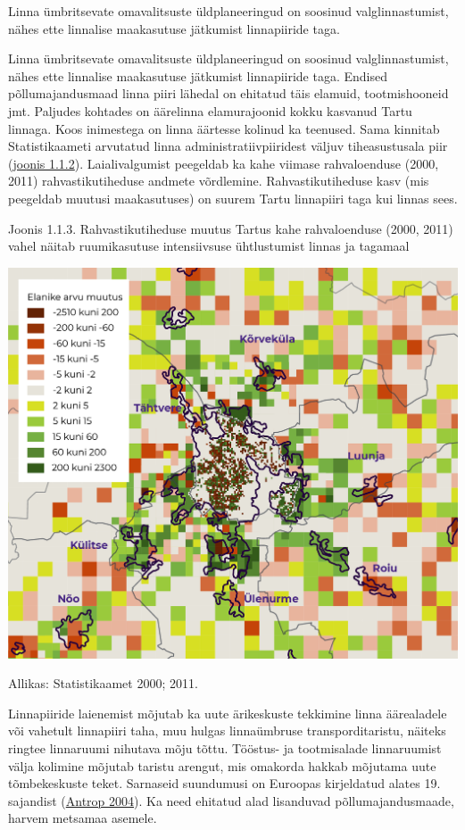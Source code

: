 \documentclass[estonian,]{article}
\begin{document}
\begin{blockquote-left}
Linna ümbritsevate omavalitsuste üldplaneeringud on soosinud
valglinnastumist, nähes ette linnalise maakasutuse jätkumist
linnapiiride taga.
\end{blockquote-left}

Linna ümbritsevate omavalitsuste üldplaneeringud on soosinud valglinnastumist, nähes ette linnalise maakasutuse jätkumist linnapiiride taga. Endised põllumajandusmaad linna piiri lähedal on ehitatud täis elamuid, tootmishooneid jmt. Paljudes kohtades on äärelinna elamurajoonid kokku kasvanud Tartu linnaga. Koos inimestega on linna äärtesse kolinud ka teenused. Sama kinnitab Statistikaameti arvutatud linna administratiivpiiridest väljuv tiheasustusala piir (\protect\hyperlink{figure112}{joonis 1.1.2}). Laialivalgumist peegeldab ka kahe viimase rahvaloenduse (2000, 2011) rahvastikutiheduse andmete võrdlemine. Rahvastikutiheduse kasv (mis peegeldab muutusi maakasutuses) on suurem Tartu linnapiiri taga kui linnas sees.

{Joonis 1.1.3.} Rahvastikutiheduse muutus Tartus kahe rahvaloenduse (2000, 2011) vahel näitab ruumikasutuse intensiivsuse ühtlustumist linnas ja tagamaal

\begin{center}\includegraphics[width=0.8\linewidth]{figures/1-chapter/fig113} \end{center}

\begin{imgsource}
{Allikas:} Statistikaamet 2000; 2011.
\end{imgsource}

Linnapiiride laienemist mõjutab ka uute ärikeskuste tekkimine linna äärealadele või vahetult linnapiiri taha, muu hulgas linnaümbruse transporditaristu, näiteks ringtee linnaruumi nihutava mõju tõttu. Tööstus- ja tootmisalade linnaruumist välja kolimine mõjutab taristu arengut, mis omakorda hakkab mõjutama uute tõmbekeskuste teket. Sarnaseid suundumusi on Euroopas kirjeldatud alates 19. sajandist (\protect\hyperlink{Antrop2004}{Antrop 2004}). Ka need ehitatud alad lisanduvad põllumajandusmaade, harvem metsamaa asemele.
\end{document}
